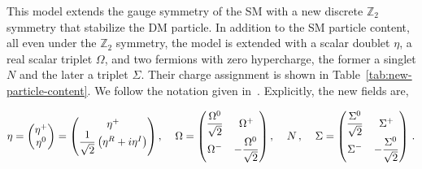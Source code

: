 \documentclass[12pt,letterpaper]{article}
\begin{document}
This model extends the gauge symmetry of the SM with a new discrete $\mathbb{Z}_2$ symmetry that stabilize the DM particle. In addition to the SM particle content, all even under the $\mathbb{Z}_2$ symmetry, the model is extended with a scalar doublet $\eta$, a real scalar triplet $\Omega$, and two fermions with zero hypercharge, the former a singlet $N$ and the later a triplet $\Sigma$. Their charge assignment is shown in Table~\ref{tab:new-particle-content}. We follow the notation given in~\cite{Merle:2016scw, Rocha-Moran:2016enp}. Explicitly, the new fields are,

\begin{align}
\eta = 
\begin{pmatrix}
\eta^+ \\
\eta^0
\end{pmatrix}
=\begin{pmatrix}
\eta^+ \\
\dfrac{1}{\sqrt{2}}\left(\eta^R+i\eta^I\right)
\end{pmatrix}, \;\hspace{0.3 cm}
\Omega = 
\begin{pmatrix}
\dfrac{\Omega^0}{\sqrt{2}} & \Omega^+ \\
\Omega^- & -\dfrac{\Omega^0}{\sqrt{2}}
\end{pmatrix}, \;\hspace{0.3 cm}
N\,, \;\hspace{0.3 cm}
\Sigma = 
\begin{pmatrix}
\dfrac{\Sigma^0}{\sqrt{2}} & \Sigma^+ \\
\Sigma^- & -\dfrac{\Sigma^0}{\sqrt{2}}
\end{pmatrix}\,.
\end{align}
   
\end{document}
